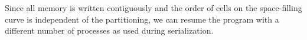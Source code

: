 



Since all memory is written contiguously and the order of cells on the space-filling curve is independent of the partitioning, we can resume the program with a different number of processes as used during serialization.

